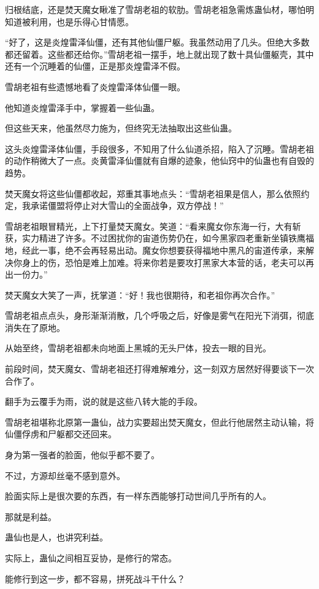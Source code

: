 \begin{this_body}
归根结底，还是焚天魔女瞅准了雪胡老祖的软肋。雪胡老祖急需炼蛊仙材，哪怕明知道被利用，也是乐得心甘情愿。

“好了，这是炎煌雷泽仙僵，还有其他仙僵尸躯。我虽然动用了几头。但绝大多数都还留着。这些都还给你。”雪胡老祖一摆手，地上就出现了数十具仙僵躯壳，其中还有一个沉睡着的仙僵，正是那炎煌雷泽不假。

雪胡老祖有些遗憾地看了炎煌雷泽体仙僵一眼。

他知道炎煌雷泽手中，掌握着一些仙蛊。

但这些天来，他虽然尽力施为，但终究无法抽取出这些仙蛊。

这头炎煌雷泽体仙僵，手段很多，不知用了什么仙道杀招，陷入了沉睡。雪胡老祖的动作稍微大了一点。炎黄雷泽仙僵就有自爆的迹象，他仙窍中的仙蛊也有自毁的趋势。

焚天魔女将这些仙僵都收起，郑重其事地点头：“雪胡老祖果是信人，那么依照约定，我承诺僵盟将停止对大雪山的全面战争，双方停战！”

雪胡老祖眼冒精光，上下打量焚天魔女。笑道：“看来魔女你东海一行，大有斩获，实力精进了许多。不过困扰你的宙道伤势仍在，如今黑家四老重新坐镇铁鹰福地，经此一事，绝不会再轻易出动。魔女你想要获得福地中黑凡的宙道传承，来解决你身上的伤，恐怕是难上加难。将来你若是要攻打黑家大本营的话，老夫可以再出一份力。”

焚天魔女大笑了一声，抚掌道：“好！我也很期待，和老祖你再次合作。”

雪胡老祖点点头，身形渐渐消散，几个呼吸之后，好像是雾气在阳光下消弭，彻底消失在了原地。

从始至终，雪胡老祖都未向地面上黑城的无头尸体，投去一眼的目光。

前段时间，焚天魔女、雪胡老祖还打得难解难分，这一刻双方居然好得要谈下一次合作了。

翻手为云覆手为雨，说的就是这些八转大能的手段。

雪胡老祖堪称北原第一蛊仙，战力实要超出焚天魔女，但此行他居然主动认输，将仙僵俘虏和尸躯都交还回来。

身为第一强者的脸面，他似乎都不要了。

不过，方源却丝毫不感到意外。

脸面实际上是很次要的东西，有一样东西能够打动世间几乎所有的人。

那就是利益。

蛊仙也是人，也讲究利益。

实际上，蛊仙之间相互妥协，是修行的常态。

能修行到这一步，都不容易，拼死战斗干什么？


\end{this_body}
